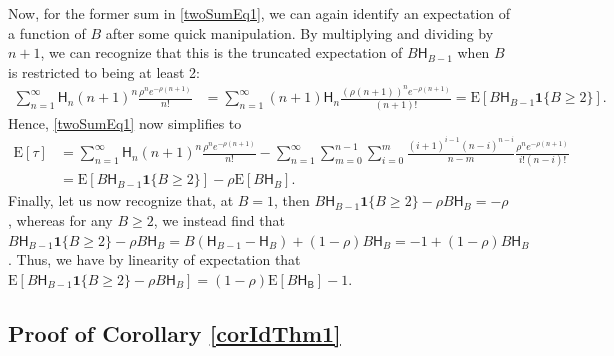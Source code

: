 \documentclass[opre,nonblindrev]{informs3_no_remark}
\newcommand{\E}[1]{{\mathrm{E}\left[#1\right]}}
\begin{document}
Now, for the former sum in \eqref{twoSumEq1}, we can again identify an expectation of a function of $B$ after some quick manipulation. By multiplying and dividing by $n+1$, we can recognize that this is the truncated expectation of $B \mathsf{H}_{B-1}$ when $B$ is restricted to being at least 2:
\begin{align}
\sum_{n=1}^\infty 
\mathsf{H}_n (n+1)^{n} \frac{\rho^n e^{-\rho(n+1)}}{n!}
&=
\sum_{n=1}^\infty 
(n+1)\mathsf{H}_n  \frac{\left(\rho(n+1)\right)^n e^{-\rho(n+1)}}{(n+1)!}
=
\E{B \mathsf{H}_{B-1} \mathbf{1}\{B \geq 2\}}
.
\end{align}
Hence, \eqref{twoSumEq1} now simplifies to
\begin{align}
\E{\tau}
&=
\sum_{n=1}^\infty 
\mathsf{H}_n (n+1)^{n} \frac{\rho^n e^{-\rho(n+1)}}{n!}
-
\sum_{n=1}^\infty
\sum_{m=0}^{n-1}
\sum_{i=0}^m
\frac{\left({i+1}\right)^{i-1}
\left({n-i}\right)^{n-i}}{n-m}
 \frac{\rho^n e^{-\rho(n+1)}}{i!(n-i)!}
\\
&=
\E{B \mathsf{H}_{B-1} \mathbf{1}\{B \geq 2\}}
-
\rho \E{B \mathsf{H}_{B}}
.
\end{align}
Finally, let us now recognize that, at $B = 1$, then
$
B \mathsf{H}_{B-1} \mathbf{1}\{B \geq 2\}
-
\rho B \mathsf{H}_{B}
=
-
\rho
$,
whereas for any $B \geq 2$, we instead find that
$
B \mathsf{H}_{B-1} \mathbf{1}\{B \geq 2\}
-
\rho B \mathsf{H}_{B}
=
B (\mathsf{H}_{B-1} - \mathsf{H}_B)
+
(1-\rho) B \mathsf{H}_{B}
=
-1
+
(1-\rho) B \mathsf{H}_{B}
$.
Thus, we have by linearity of expectation that
$\E{B \mathsf{H}_{B-1} \mathbf{1}\{B \geq 2\}
-
\rho B \mathsf{H}_{B}}
=
(1-\rho)\E{B \mathsf{H}_\mathsf{B}}
-
1$.
\hfill\Halmos\endproof


\subsection{Proof of Corollary \ref{corIdThm1}}

\end{document}
